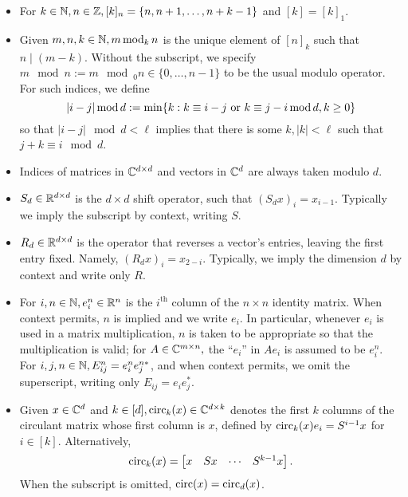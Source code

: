 {\renewcommand{\thefootnote}{\fnsymbol{footnote}}}

\begin{itemize}
\item For $k \in \mathbb{N}, n \in \mathbb{Z}, [k]_n = \{n, n + 1, \ldots, n + k - 1\}$ and $[k] = [k]_1$.
\item Given $m, n, k \in \mathbb{N}, m \operatorname{\mathbin{mod}}_k n$ is the unique element of $[n]_k$ such that $n \mid (m - k)$.  Without the subscript, we specify $m \mod n := m \mod_0 n \in \{0, \ldots, n - 1\}$ to be the usual modulo operator.  For such indices, we define \begin{equation} \abs{i - j} \mod d := \min \{k : k \equiv i - j \ \text{or} \ k \equiv j - i \mod d, k \ge 0\} \label{eq:modabs} \end{equation} so that $|i - j| \mod d < \ell$ implies that there is some $k, |k| < \ell$ such that $j + k \equiv i \mod d$.
\item Indices of matrices in $\mathbb{C}^{d \times d}$ and vectors in $\mathbb{C}^d$ are always taken modulo $d$.
\item $S_d \in \mathbb{R}^{d \times d}$ is the $d \times d$ shift operator, such that $(S_d x)_i = x_{i - 1}$.  Typically we imply the subscript by context, writing $S$.
\item $R_d \in \mathbb{R}^{d \times d}$ is the operator that reverses a vector's entries, leaving the first entry fixed.  Namely, $(R_d x)_i = x_{2 - i}$.  Typically, we imply the dimension $d$ by context and write only $R$.
\item For $i, n \in \mathbb{N}, e_i^n \in \mathbb{R}^n$ is the $i^{\text{th}}$ column of the $n \times n$ identity matrix.  When context permits, $n$ is implied and we write $e_i$.  In particular, whenever $e_i$ is used in a matrix multiplication, $n$ is taken to be appropriate so that the multiplication is valid; for $A \in \mathbb{C}^{m \times n},$ the ``$e_i$'' in $A e_i$ is assumed to be $e_i^n$.  For $i, j, n \in \mathbb{N}, E_{ij}^n = e_i^n e_j^{n*}$, and when context permits, we omit the superscript, writing only $E_{ij} = e_i e_j^*$.
\item Given $x \in \mathbb{C}^d$ and $k \in [d], \operatorname{circ}_k(x) \in \mathbb{C}^{d \times k}$ denotes the first $k$ columns of the circulant matrix whose first column is $x$, defined by $\operatorname{circ}_k(x) e_i = S^{i - 1} x$ for $i \in [k]$.  Alternatively, \[\operatorname{circ}_k(x) = \begin{bmatrix} x & S x & \cdots & S^{k-1} x \end{bmatrix}.\]  When the subscript is omitted, $\operatorname{circ}(x) = \operatorname{circ}_d(x)$.

\end{itemize}
